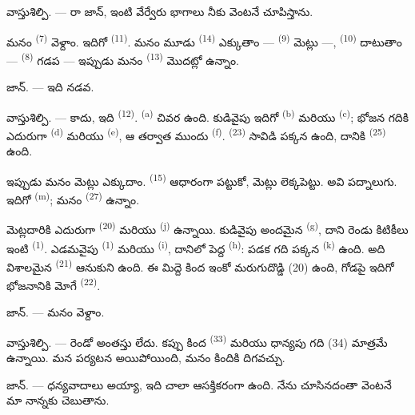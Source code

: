 \textsc{వాస్తుశిల్పి}. --- రా జాన్, ఇంటి వేర్వేరు భాగాలు నీకు వెంటనే చూపిస్తాను.

మనం  \textsuperscript{(7)} వెళ్దాం. ఇదిగో 
\textsuperscript{(11)}. మనం మూడు  \textsuperscript{(14)} ఎక్కుతాం —
 \textsuperscript{(9)} మెట్లు —,  \textsuperscript{(10)} దాటుతాం —
 \textsuperscript{(8)} గడప — ఇప్పుడు మనం 
\textsuperscript{(13)} మొదట్లో ఉన్నాం.

\textsc{జాన్}. --- ఇది నడవ.

\textsc{వాస్తుశిల్పి}. --- కాదు, ఇది  \textsuperscript{(12)}. 
\textsuperscript{(a)} చివర ఉంది. కుడివైపు ఇదిగో  \textsuperscript{(b)} మరియు
 \textsuperscript{(c)}; భోజన గదికి ఎదురుగా 
\textsuperscript{(d)} మరియు  \textsuperscript{(e)}, ఆ తర్వాత ముందు
 \textsuperscript{(f)}.  \textsuperscript{(23)} సావిడి పక్కన
ఉంది, దానికి  \textsuperscript{(25)} ఉంది.

ఇప్పుడు మనం మెట్లు ఎక్కుదాం.  \textsuperscript{(15)} ఆధారంగా పట్టుకో,
మెట్లు లెక్కపెట్టు. అవి పద్నాలుగు. ఇదిగో  \textsuperscript{(m)}; మనం
 \textsuperscript{(27)} ఉన్నాం.

\VUsaut{3.0mm}
\VUsaut{3.0mm}

మెట్లదారికి ఎదురుగా  \textsuperscript{(20)} మరియు 
\textsuperscript{(j)} ఉన్నాయి. కుడివైపు అందమైన  \textsuperscript{(g)}, దాని
రెండు కిటికీలు ఇంటి  \textsuperscript{(1)}. ఎడమవైపు 
\textsuperscript{(1)} మరియు  \textsuperscript{(i)}, దానిలో పెద్ద
 \textsuperscript{(h)}: పడక గది పక్కన  \textsuperscript{(k)}
ఉంది. అది విశాలమైన  \textsuperscript{(21)} ఆనుకుని ఉంది. ఈ మిద్దె కింద ఇంకో
మరుగుదొడ్డి (20) ఉంది, గోడపై ఇదిగో భోజనానికి మోగే  \textsuperscript{(22)}.

\textsc{జాన్}. --- మనం  వెళ్దాం.

\textsc{వాస్తుశిల్పి}. --- రెండో అంతస్తు లేదు. కప్పు కింద 
\textsuperscript{(33)} మరియు ధాన్యపు గది (34) మాత్రమే ఉన్నాయి. మన పర్యటన అయిపోయింది, మనం
కిందికి దిగవచ్చు.

\textsc{జాన్}. --- ధన్యవాదాలు అయ్యా, ఇది చాలా ఆసక్తికరంగా ఉంది. నేను చూసినదంతా వెంటనే మా
నాన్నకు చెబుతాను.

\VUsaut{4.0mm}
\VUfilet{22mm}
